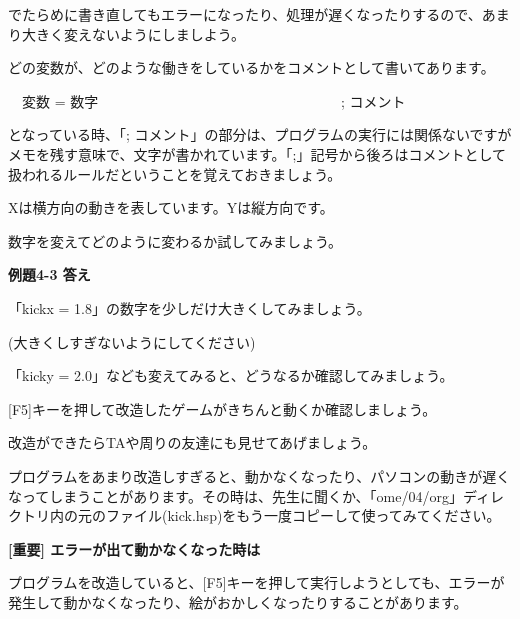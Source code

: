 \documentclass[a4paper,dvipdfmx]{jarticle}
\newcommand\textstyleqwerty[1]{#1}
\begin{document}
\bigskip


\bigskip


\bigskip


\bigskip


\bigskip

でたらめに書き直してもエラーになったり、処理が遅くなったりするので、あまり大きく変えないようにしましよう。

どの変数が、どのような働きをしているかをコメントとして書いてあります。


\bigskip

\ \ 変数 = 数字 \ \ \ \ \ \ \ \ \ \ \ \ \ \ \ \ \ \ \ \ \ \ \ \ \ \ \ \ \ \ \ \ \ \ ;
コメント


\bigskip

となっている時、「;
コメント」の部分は、プログラムの実行には関係ないですがメモを残す意味で、文字が書かれています。「;」記号から後ろはコメントとして扱われるルールだということを覚えておきましょう。

Xは横方向の動きを表しています。Yは縦方向です。

数字を変えてどのように変わるか試してみましょう。


\bigskip


\bigskip

{\bfseries
例題4-3 答え}


\bigskip

「kickx =
1.8」の数字を少しだけ大きくしてみましょう。

(大きくしすぎないようにしてください)

「kicky =
2.0」なども変えてみると、どうなるか確認してみましょう。


\bigskip

[F5]キーを押して改造したゲームがきちんと動くか確認しましょう。

改造ができたらTAや周りの友達にも見せてあげましょう。


\bigskip

プログラムをあまり改造しすぎると、動かなくなったり、パソコンの動きが遅くなってしまうことがあります。その時は、先生に聞くか、「ome/04/org」ディレクトリ内の元のファイル(kick.hsp)をもう一度コピーして使ってみてください。


\bigskip


\bigskip

\textstyleqwerty{\textbf{[重要]
エラーが出て動かなくなった時は}}


\bigskip

プログラムを改造していると、[F5]キーを押して実行しようとしても、エラーが発生して動かなくなったり、絵がおかしくなったりすることがあります。
\end{document}
